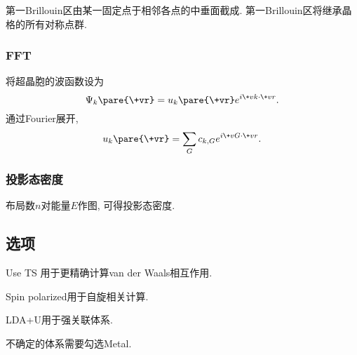 \documentclass[hidelinks]{ctexart}
\begin{document}
第一Brillouin区由某一固定点于相邻各点的中垂面截成. 第一Brillouin区将继承晶格的所有对称点群.


\subsubsection{FFT} %
\label{ssub:fft}

将超晶胞的波函数设为
\[ \Psi_k\pare{\+vr} = u_k\pare{\+vr} e^{i\+vk\cdot \+vr}. \]
通过Fourier展开,
\[ u_k\pare{\+vr} = \sum_G c_{k,G} e^{i\+vG\cdot \+vr}. \]


\subsubsection{投影态密度} %
\label{ssub:投影态密度}

布局数$n$对能量$E$作图, 可得投影态密度.



\subsection{选项} %
\label{sub:选项}

\begin{cenum}
    \item Use TS 用于更精确计算van der Waals相互作用.
    \item Spin polarized用于自旋相关计算.
    \item LDA+U用于强关联体系.
    \item 不确定的体系需要勾选Metal.
\end{cenum}


\end{document}

